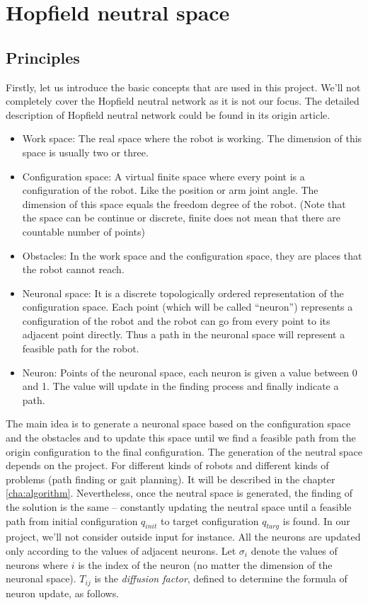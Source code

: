 \chapter{Hopfield neutral space}
\label{cha:hopfield}

\section{Principles}
\label{sec:hopfield_Principles}
Firstly, let us introduce the basic concepts that are used in this project. We'll not completely cover the Hopfield neutral network as it is not our focus. 
The detailed description of Hopfield neutral network could be found in its origin article\cite{HOPFIELD}.
\begin{itemize}
    \item Work space: The real space where the robot is working. The dimension of this space is usually two or three.
    \item Configuration space: A virtual finite space where every point is a configuration of the robot. Like the position or arm joint angle. The dimension of this space equals the freedom degree of the robot. (Note that the space can be continue or discrete, finite does not mean that there are countable number of points)
    \item Obstacles: In the work space and the configuration space, they are places that the robot cannot reach.
    \item Neuronal space: It is a discrete topologically ordered representation of the configuration space. Each point (which will be called “neuron”) represents a configuration of the robot and the robot can go from every point to its adjacent point directly. Thus a path in the neuronal space will represent a feasible path for the robot.
    \item Neuron: Points of the neuronal space, each neuron is given a value between 0 and 1. The value will update in the finding process and finally indicate a path.
\end{itemize}

The main idea is to generate a neuronal space based on the configuration space and the obstacles and to update this space until we find a feasible path from the origin configuration to the final configuration.
The generation of the neutral space depends on the project. For different kinds of robots and different kinds of problems (path finding or gait planning). It will be described in the chapter \ref{cha:algorithm}.
Nevertheless, once the neutral space is generated, the finding of the solution is the same -- 
constantly updating the neutral space until a feasible path from initial configuration $q_{init}$ to target configuration $q_{targ}$ is found.
In our project, we'll not consider outside input for instance. All the neurons are updated only according to the values of adjacent neurons.
Let $\sigma_i$ denote the values of neurons where $i$ is the index of the neuron (no matter the dimension of the neuronal space).
$T_{ij}$ is the \textit{diffusion factor}, defined to determine the formula of neuron update, as follows. 


